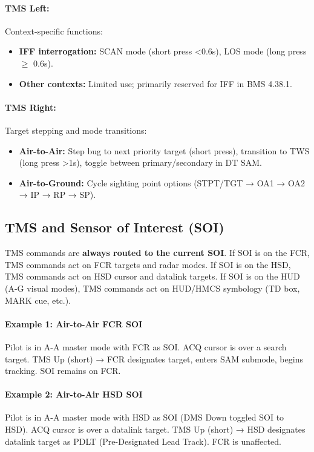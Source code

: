 \documentclass[11pt, a4paper, twoside]{report}
\begin{document}
\paragraph{TMS Left:}
Context-specific functions:
\begin{itemize}
    \item \textbf{IFF interrogation:} SCAN mode (short press <0.6s), LOS mode (long press $\geq$ 0.6s).
    \item \textbf{Other contexts:} Limited use; primarily reserved for IFF in BMS 4.38.1.
\end{itemize}

\paragraph{TMS Right:}
Target stepping and mode transitions:
\begin{itemize}
    \item \textbf{Air-to-Air:} Step bug to next priority target (short press), transition to TWS (long press >1s), toggle between primary/secondary in DT SAM.
    \item \textbf{Air-to-Ground:} Cycle sighting point options (STPT/TGT → OA1 → OA2 → IP → RP → SP).
\end{itemize}

\subsection{TMS and Sensor of Interest (SOI)}
\label{sec:C4-S1-S3}

TMS commands are \textbf{always routed to the current SOI}. If SOI is on the FCR, TMS commands act on FCR targets and radar modes. If SOI is on the HSD, TMS commands act on HSD cursor and datalink targets. If SOI is on the HUD (A-G visual modes), TMS commands act on HUD/HMCS symbology (TD box, MARK cue, etc.).

\paragraph{Example 1: Air-to-Air FCR SOI}
Pilot is in A-A master mode with FCR as SOI. ACQ cursor is over a search target. TMS Up (short) → FCR designates target, enters SAM submode, begins tracking. SOI remains on FCR.

\paragraph{Example 2: Air-to-Air HSD SOI}
Pilot is in A-A master mode with HSD as SOI (DMS Down toggled SOI to HSD). ACQ cursor is over a datalink target. TMS Up (short) → HSD designates datalink target as PDLT (Pre-Designated Lead Track). FCR is unaffected.
\end{document}
